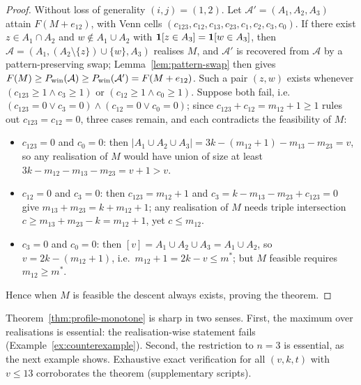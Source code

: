 \begin{proof}
  Without loss of generality $(i,j) = (1,2)$.  Let
  $\mathcal{A}' = (A_1, A_2, A_3)$ attain $F(M + e_{12})$, with Venn cells
  $(c_{123}, c_{12}, c_{13}, c_{23}, c_1, c_2, c_3, c_0)$.  If there
  exist $z \in A_1 \cap A_2$ and $w \notin A_1 \cup A_2$ with
  $\mathbf{1}\!\left[z \in A_3\right] = \mathbf{1}\!\left[w \in A_3\right]$, then
  $\mathcal{A} = (A_1, (A_2 \setminus \{z\}) \cup \{w\}, A_3)$ realises
  $M$, and $\mathcal{A}'$ is recovered from $\mathcal{A}$ by a
  pattern-preserving swap; Lemma~\ref{lem:pattern-swap} then gives
  $F(M) \ge P_{\mathrm{win}}(\mathcal{A}) \ge P_{\mathrm{win}}(\mathcal{A}') = F(M + e_{12})$.
  Such a pair $(z, w)$ exists whenever
  $(c_{123} \ge 1 \wedge c_3 \ge 1)$ or
  $(c_{12} \ge 1 \wedge c_0 \ge 1)$.  Suppose both fail, i.e.\
  $(c_{123} = 0 \vee c_3 = 0) \wedge (c_{12} = 0 \vee c_0 = 0)$; since
  $c_{123} + c_{12} = m_{12} + 1 \ge 1$ rules out
  $c_{123} = c_{12} = 0$, three cases remain, and each contradicts the
  feasibility of $M$:
  \begin{itemize}
    \item[(a)] $c_{123} = 0$ and $c_0 = 0$: then
      $|A_1 \cup A_2 \cup A_3| = 3k - (m_{12}{+}1) - m_{13} - m_{23} = v$,
      so any realisation of $M$ would have union of size at least
      $3k - m_{12} - m_{13} - m_{23} = v + 1 > v$.
    \item[(b)] $c_{12} = 0$ and $c_3 = 0$: then $c_{123} = m_{12}+1$ and
      $c_3 = k - m_{13} - m_{23} + c_{123} = 0$ give
      $m_{13} + m_{23} = k + m_{12} + 1$; any realisation of $M$ needs
      triple intersection $c \ge m_{13} + m_{23} - k = m_{12} + 1$, yet
      $c \le m_{12}$.
    \item[(c)] $c_3 = 0$ and $c_0 = 0$: then
      $[v] = A_1 \cup A_2 \cup A_3 = A_1 \cup A_2$, so
      $v = 2k - (m_{12}+1)$, i.e.\ $m_{12} + 1 = 2k - v \le m^*$; but $M$
      feasible requires $m_{12} \ge m^*$.
  \end{itemize}
  Hence when $M$ is feasible the descent always exists, proving the
  theorem.
\end{proof}

\begin{remark}
  Theorem~\ref{thm:profile-monotone} is sharp in two senses.  First, the
  maximum over realisations is essential: the realisation-wise statement
  fails (Example~\ref{ex:counterexample}).  Second, the restriction to
  $n = 3$ is essential, as the next example shows.  Exhaustive exact
  verification for all $(v,k,t)$ with $v \le 13$ corroborates the theorem
  (supplementary scripts).
\end{remark}


